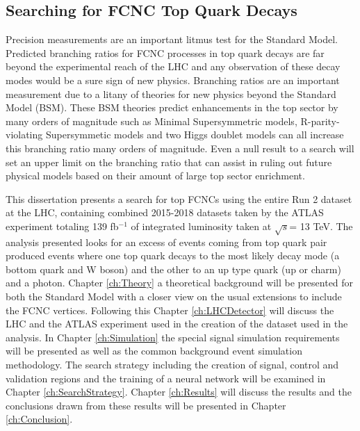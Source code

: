 \subsection{Searching for FCNC Top Quark Decays}
Precision measurements are an important litmus test for the Standard Model.  Predicted branching ratios for FCNC processes in top quark decays are far beyond the experimental reach of the LHC and any observation of these decay modes would be a sure sign of new physics.  Branching ratios are an important measurement due to a litany of theories for new physics beyond the Standard Model (BSM).  These BSM theories predict enhancements in the top sector by many orders of magnitude such as Minimal Supersymmetric models\cite{MSSM}, R-parity-violating Supersymmetic models\cite{RPVSUSY} and two Higgs doublet models\cite{2HDM} can all increase this branching ratio many orders of magnitude.  Even a null result to a search will set an upper limit on the branching ratio that can assist in ruling out future physical models based on their amount of large top sector enrichment.

This dissertation presents a search for top FCNCs using the entire Run 2 dataset at the LHC, containing combined 2015-2018 datasets taken by the ATLAS experiment totaling 139 fb$^{-1}$ of integrated luminosity taken at $\sqrt{s}$= 13 TeV.  The analysis presented looks for an excess of events coming from top quark pair produced events where one top quark decays to the most likely decay mode (a bottom quark and W boson) and the other to an up type quark (up or charm) and a photon. Chapter \ref{ch:Theory} a theoretical background will be presented for both the Standard Model with a closer view on the usual extensions to include the FCNC vertices.  Following this  Chapter \ref{ch:LHCDetector} will discuss the LHC and the ATLAS experiment used in the creation of the dataset used in the analysis.  In Chapter \ref{ch:Simulation} the special signal simulation requirements will be presented as well as the common background event simulation methodology.  The search strategy including the creation of signal, control and validation regions and the training of a neural network will be examined in Chapter \ref{ch:SearchStrategy}.  Chapter \ref{ch:Results} will discuss the results and the conclusions drawn from these results will be presented in Chapter \ref{ch:Conclusion}.